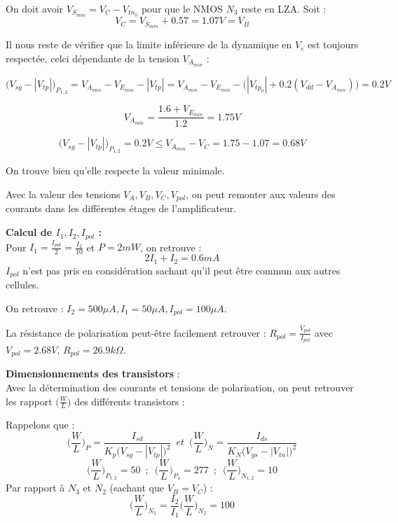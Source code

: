 \documentclass[11pt]{article}
\begin{document}
On doit avoir $V_{S_{min}} = V_C - V_{tn_0}$ pour que le NMOS $N_3$ reste en LZA.
Soit :
\[
V_C = V_{S_{min}} + 0.57 = 1.07 V = V_B
\]

Il nous reste de v\'erifier que la limite inf\'erieure de la dynamique en $V_e$ est toujours respect\'ee,
celci d\'ependante de la tension $V_{A_{min}}$ :

\[
\bigg( V_{sg} - | V_{tp} | \bigg)_{P_{1,2}} = V_{A_{min}} - V_{E_{min}} - |V_{tp}| = V_{A_{min}} - V_{E_{min}} -
\Big( | V_{tp_{0}} | + 0.2(V_{dd} - V_{A_{min}})\Big) = 0.2V
\]

\[
V_{A_{min}} = \frac{1.6 + V_{E_{min}}}{1.2} = 1.75 V
\]

\[
\bigg( V_{sg} - | V_{tp} | \bigg)_{P_{1,2}} = 0.2V \leq V_{A_{min}} - V_C = 1.75 - 1.07 = 0.68 V
\]

On trouve bien qu'elle respecte la valeur minimale.

\clearpage

Avec la valeur des tensions $V_{A}, V_{B}, V_{C}, V_{pol}$, on peut remonter aux valeurs des courants dans
les diff\'erentes \'etages de l'amplificateur.

\textbf{Calcul de $I_1, I_2, I_{pol}$ :} \\
Pour $I_1 = \frac{I_{pol}}{2} = \frac{I_{2}}{10}$ et $P = 2 mW$, on retrouve :
\[
2I_1 + I_2 = 0.6 mA
\]
$I_{pol}$ n'est pas pris en consid\'eration sachant qu'il peut \^etre commun aux autres cellules.

On retrouve : $ I_2 = 500 \mu A, I_1 = 50 \mu A, I_{pol} = 100 \mu A$.

La r\'esistance de polarisation peut-\^etre facilement retrouver : $R_{pol} = \frac{V_{pol}}{I_{pol}}$
avec $V_{pol} = 2.68 V$, $ R_{pol} = 26.9 k \Omega$.

\textbf{Dimensionnements des transistors} :\\
Avec la d\'etermination des courants et tensions de polarisation, on peut retrouver les
rapport $\Big( \frac{W}{L} \Big)$ des diff\'erents transistors :

Rappelons que :
\[
\bigg( \frac{W}{L} \bigg)_{P} = \frac{I_{sd}}{K_p \big( V_{sg} - |V_{tp}| \big)^{2} }
\phantom{3} et \phantom{3}
\bigg( \frac{W}{L} \bigg)_{N} = \frac{I_{ds}}{K_N \big( V_{gs} - |V_{tn}| \big)^{2} } 
\]
\[
\bigg( \frac{W}{L} \bigg)_{P_{1,2}} = 50
\phantom{3}
;
\phantom{3}
\bigg( \frac{W}{L} \bigg)_{P_{4}} = 277
\phantom{3}
;
\phantom{3}
\bigg( \frac{W}{L} \bigg)_{N_{1,2}} = 10
\]
Par rapport \`a $N_3$ et $N_2$ (sachant que $V_B = V_C$) :
\[
\bigg( \frac{W}{L} \bigg)_{N_{3}} = \frac{I_2}{I_1} \bigg( \frac{W}{L} \bigg)_{N_{2}}  = 100  
\]
\end{document}
